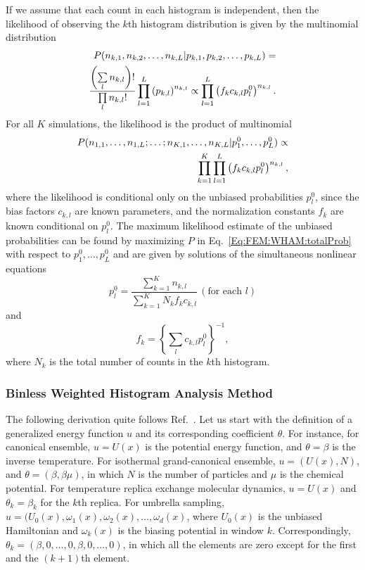 If we assume that each count in each histogram is independent, then the likelihood of observing the $k$th histogram distribution is given by the multinomial distribution
\begin{align}
P(n_{k,1},n_{k,2},\dots,n_{k,L}|p_{k,1},p_{k,2},\dots,p_{k,L})=\notag\\
\frac{\left(\sum\limits_l n_{k,l}\right)!}{\prod\limits_l n_{k,l}!}\prod\limits_{l=1}^L\left(p_{k,l}\right)^{n_{k,l}}\propto\prod\limits_{l=1}^{L}\left(f_kc_{k,l}p_l^0\right)^{n_{k,l}}.
\end{align}
For all $K$ simulations, the likelihood is the product of multinomial
\begin{align}
P(n_{1,1},\dots,n_{1,L};\dots;n_{K,1},\dots,n_{K,L}|p_1^0,\dots,p_L^0)\propto\notag\\
\prod\limits_{k=1}^K\prod\limits_{l=1}^{L}\left(f_kc_{k,l}p_l^0\right)^{n_{k,l}},
\label{Eq:FEM:WHAM:totalProb}
\end{align}
where the likelihood is conditional only on the unbiased probabilities $p_l^0$, since the bias factors $c_{k,l}$ are known parameters, and the normalization constants $f_k$ are known conditional on $p_l^0$. The maximum likelihood estimate of the unbiased probabilities can be found by maximizing $P$ in Eq.~\ref{Eq:FEM:WHAM:totalProb} with respect to $p_1^0,\dots,p_L^0$ and are given by solutions of the simultaneous nonlinear equations
\begin{equation}
p_l^0=\frac{\sum\limits_{k=1}^K n_{k,l}}{\sum\limits_{k=1}^K N_kf_kc_{k,l}}\, (\text{for each }l)
\end{equation}
and
\begin{equation}
f_k={\left\{\sum\limits_lc_{k,l}p_l^0\right\}}^{-1},
\end{equation}
where $N_k$ is the total number of counts in the $k$th histogram.

\subsubsection{Binless Weighted Histogram Analysis Method\label{Sec:FEM:WHAM_BINLESS}}
The following derivation quite follows Ref.~\cite{TanJCP2012}.
Let us start with the definition of a generalized energy function $u$ and its corresponding coefficient $\theta$. For instance, for canonical ensemble, $u=U(x)$ is the potential energy function, and $\theta=\beta$ is the inverse temperature. For isothermal grand-canonical ensemble, $u=(U(x),N)$, and $\theta=(\beta,\beta\mu)$, in which $N$ is the number of particles and $\mu$ is the chemical potential. For temperature replica exchange molecular dynamics, $u=U(x)$ and $\theta_k=\beta_k$ for the $k$th replica. For umbrella sampling, $u=(U_0(x),\omega_1(x),\omega_2(x),\dots,\omega_d(x)$, where $U_0(x)$ is the unbiased Hamiltonian and $\omega_k(x)$ is the biasing potential in window $k$. Correspondingly, $\theta_k=(\beta,0,\dots,0,\beta,0,\dots,0)$, in which all the elements are zero except for the first and the $(k+1)$th element.

